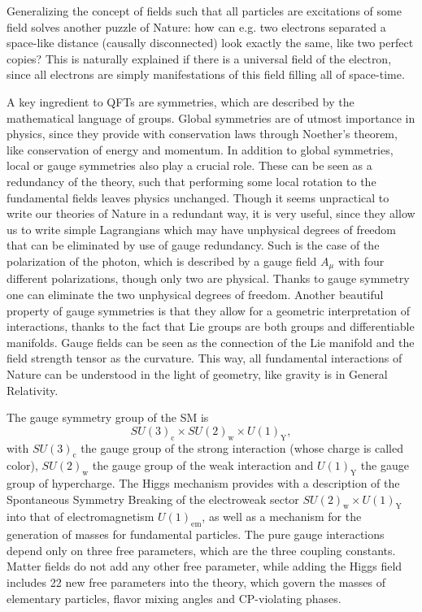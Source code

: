 Generalizing the concept of fields such that all particles are excitations of some field solves another puzzle of Nature: how can e.g. two electrons separated a space-like distance (causally disconnected) look exactly the same, like two perfect copies? This is naturally explained if there is a universal field of the electron, since all electrons are simply manifestations of this field filling all of space-time. 

A key ingredient to QFTs are symmetries, which are described by the mathematical language of groups. Global symmetries are of utmost importance in physics, since they provide with conservation laws through Noether's theorem, like conservation of energy and momentum. In addition to global symmetries, local or gauge symmetries also play a crucial role. These can be seen as a redundancy of the theory, such that performing some local rotation to the fundamental fields leaves physics unchanged. Though it seems unpractical to write our theories of Nature in a redundant way, it is very useful, since they allow us to write simple Lagrangians which may have unphysical degrees of freedom that can be eliminated by use of gauge redundancy. Such is the case of the polarization of the photon, which is described by a gauge field $A_{\mu}$ with four different polarizations, though only two are physical. Thanks to gauge symmetry one can eliminate the two unphysical degrees of freedom. Another beautiful property of gauge symmetries is that they allow for a geometric interpretation of interactions, thanks to the fact that Lie groups are both groups and differentiable manifolds. Gauge fields can be seen as the connection of the Lie manifold and the field strength tensor as the curvature. This way, all fundamental interactions of Nature can be understood in the light of geometry, like gravity is in General Relativity.

The gauge symmetry group of the SM is
\begin{equation}
SU(3)_{\textrm{c}}\times SU(2)_{\textrm{w}}\times U(1)_{\textrm{Y}},
\end{equation}
with $SU(3)_{\textrm{c}}$ the gauge group of the strong interaction (whose charge is called color), $SU(2)_{\textrm{w}}$ the gauge group of the weak interaction and $U(1)_{\textrm{Y}}$ the gauge group of hypercharge. The Higgs mechanism provides with a description of the Spontaneous Symmetry Breaking of the electroweak sector $SU(2)_{\textrm{w}}\times U(1)_{\textrm{Y}}$ into that of electromagnetism $U(1)_{\textrm{em}}$, as well as a mechanism for the generation of masses for fundamental particles. The pure gauge interactions depend only on three free parameters, which are the three coupling constants. Matter fields do not add any other free parameter, while adding the Higgs field includes 22 new free parameters into the theory, which govern the masses of elementary particles, flavor mixing angles and CP-violating phases.

